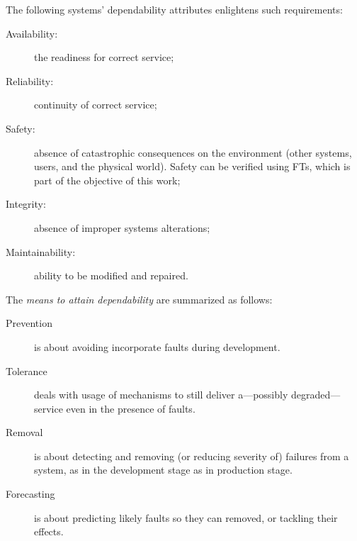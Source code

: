 \documentclass[en,twoside,onehalfspacing,phd]{risethesis}
\begin{document}
The following systems' dependability attributes enlightens such requirements:
\begin{description}
  \item[Availability:] the readiness for correct service;
  \item[Reliability:] continuity of correct service;
  \item[Safety:] absence of catastrophic consequences on the environment (other systems, users, and the physical world).
  Safety can be verified using \acp{FT}, which is part of the objective of this work;
  \item[Integrity:] absence of improper systems alterations;
  \item[Maintainability:] ability to be modified and repaired.
\end{description}

The \emph{means to attain dependability} are summarized as follows:

\begin{description}
  \item[Prevention] is about avoiding incorporate faults during development.
  \item[Tolerance] deals with usage of mechanisms to still deliver a---possibly degraded---service even in the presence of faults.
  \item[Removal] is about detecting and removing (or reducing severity of) failures from a system, as in the development stage as in production stage.
  \item[Forecasting] is about predicting likely faults so they can removed, or tackling their effects.
\end{description}
\end{document}
